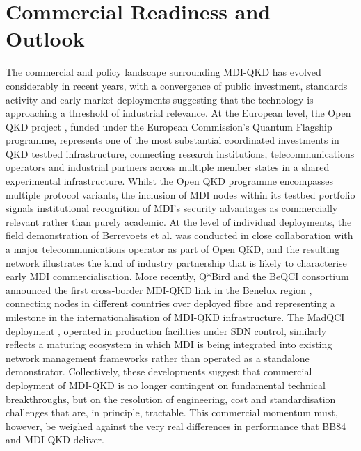 \documentclass[9pt,technote]{IEEEtran}
\begin{document}
\section{Commercial Readiness and Outlook}
The commercial and policy landscape surrounding MDI-QKD has evolved considerably in recent years, with a convergence of public investment, standards activity and early-market deployments suggesting that the technology is approaching a threshold of industrial relevance. At the European level, the Open QKD project \cite{eu_open_qkd}, funded under the European Commission's Quantum Flagship programme, represents one of the most substantial coordinated investments in QKD testbed infrastructure, connecting research institutions, telecommunications operators and industrial partners across multiple member states in a shared experimental infrastructure. Whilst the Open QKD programme encompasses multiple protocol variants, the inclusion of MDI nodes within its testbed portfolio signals institutional recognition of MDI's security advantages as commercially relevant rather than purely academic. At the level of individual deployments, the field demonstration of Berrevoets et al. \cite{Berrevoets_2022} was conducted in close collaboration with a major telecommunications operator as part of Open QKD, and the resulting network illustrates the kind of industry partnership that is likely to characterise early MDI commercialisation. More recently, Q*Bird and the BeQCI consortium announced the first cross-border MDI-QKD link in the Benelux region \cite{qbird_belQCI}, connecting nodes in different countries over deployed fibre and representing a milestone in the internationalisation of MDI-QKD infrastructure. The MadQCI deployment \cite{Martins2024}, operated in production facilities under SDN control, similarly reflects a maturing ecosystem in which MDI is being integrated into existing network management frameworks rather than operated as a standalone demonstrator. Collectively, these developments suggest that commercial deployment of MDI-QKD is no longer contingent on fundamental technical breakthroughs, but on the resolution of engineering, cost and standardisation challenges that are, in principle, tractable. This commercial momentum must, however, be weighed against the very real differences in performance that BB84 and MDI-QKD deliver.
\end{document}
